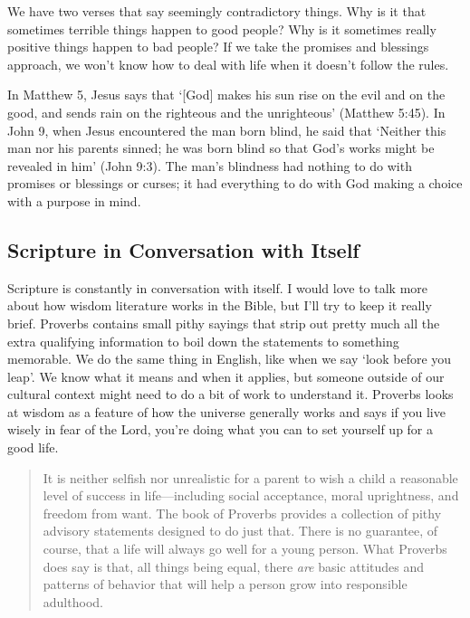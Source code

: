 We have two verses that say seemingly contradictory things. Why is it that
sometimes terrible things happen to good people? Why is it sometimes really
positive things happen to bad people? If we take the promises and blessings
approach, we won't know how to deal with life when it doesn't follow the rules.

In Matthew 5, Jesus says that `[God] makes his sun rise on the evil and on the
good, and sends rain on the righteous and the unrighteous' (Matthew 5:45). In
John 9, when Jesus encountered the man born blind, he said that `Neither this
man nor his parents sinned; he was born blind so that God's works might be
revealed in him' (John 9:3). The man's blindness had nothing to do with promises
or blessings or curses; it had everything to do with God making a choice with a
purpose in mind.

\subsection{Scripture in Conversation with Itself}

Scripture is constantly in conversation with itself. I would love to talk more
about how wisdom literature works in the Bible, but I'll try to keep it really
brief. Proverbs contains small pithy sayings that strip out pretty much all the
extra qualifying information to boil down the statements to something memorable.
We do the same thing in English, like when we say `look before you leap'. We
know what it means and when it applies, but someone outside of our cultural
context might need to do a bit of work to understand it. Proverbs looks at
wisdom as a feature of how the universe generally works and says if you live
wisely in fear of the Lord, you're doing what you can to set yourself up for a
good life.

\begin{quote}
    It is neither selfish nor unrealistic for a parent to wish a child a
    reasonable level of success in life---including social acceptance, moral
    uprightness, and freedom from want. The book of Proverbs provides a
    collection of pithy advisory statements designed to do just that. There is
    no guarantee, of course, that a life will always go well for a young person.
    What Proverbs does say is that, all things being equal, there \textit{are}
    basic attitudes and patterns of behavior that will help a person grow into
    responsible adulthood.
\end{quote}

